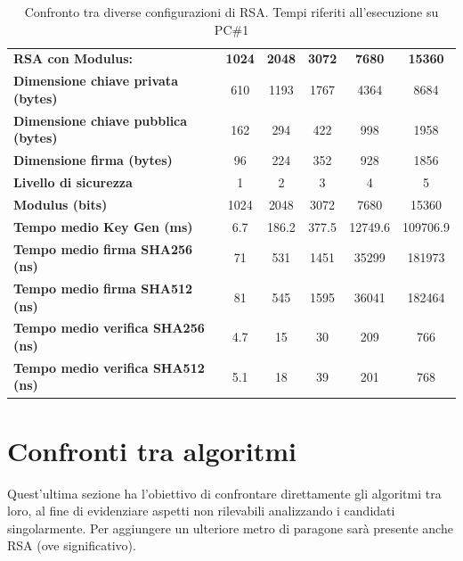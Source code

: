 \begin{table}[H]
    \centering
    \begin{tabular}{lccccc}
        \toprule
        \textbf{RSA con Modulus:} & \textbf{1024} & \textbf{2048} & \textbf{3072} & \textbf{7680} & \textbf{15360} \\
        \cmidrule(lr){1-6}
        \textbf{Dimensione chiave privata (bytes)} & 610 & 1193 & 1767 & 4364 & 8684 \\
        \textbf{Dimensione chiave pubblica (bytes)} & 162 & 294 & 422 & 998 & 1958 \\
        \textbf{Dimensione firma (bytes)} & 96 & 224 & 352 & 928 & 1856 \\
        \textbf{Livello di sicurezza} & 1 & 2 & 3 & 4 & 5 \\
        \textbf{Modulus (bits)} & 1024 & 2048 & 3072 & 7680 & 15360 \\
        \textbf{Tempo medio Key Gen (ms)} & 6.7 & 186.2 & 377.5 & 12749.6 & 109706.9 \\
        \textbf{Tempo medio firma SHA256 (ns)} & 71 & 531 & 1451 & 35299 & 181973 \\
        \textbf{Tempo medio firma SHA512 (ns)} & 81 & 545 & 1595 & 36041 & 182464 \\
        \textbf{Tempo medio verifica SHA256 (ns)} & 4.7 & 15 & 30 & 209 & 766 \\
        \textbf{Tempo medio verifica SHA512 (ns)} & 5.1 & 18 & 39 & 201 & 768 \\
        \bottomrule
    \end{tabular}
    \caption{Confronto tra diverse configurazioni di RSA. Tempi riferiti all'esecuzione su PC\#1}
    \label{tab:rsa_comparison}
\end{table}



\section{Confronti tra algoritmi}

Quest'ultima sezione ha l'obiettivo di confrontare direttamente gli algoritmi tra loro, al fine di evidenziare aspetti non rilevabili analizzando i candidati singolarmente. Per aggiungere un ulteriore metro di paragone sarà presente anche RSA (ove significativo).


